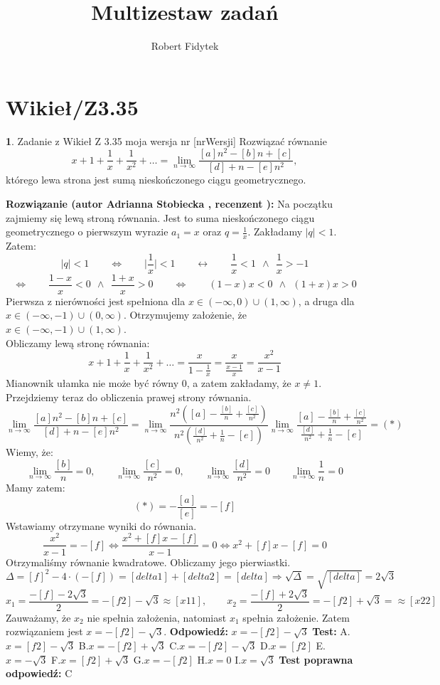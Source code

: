 \documentclass[12pt, a4paper]{article}
\title{Multizestaw zadań}
\author{Robert Fidytek}
\date{}
\theoremstyle{definition} %
\newtheorem{zad}{}
\newcommand{\kategoria}[1]{\section{#1}} %
\newcommand{\zadStart}[1]{\begin{zad}#1\newline} %
\newcommand{\zadStop}{\end{zad}}   %
\newcommand{\rozwStart}[2]{\noindent \textbf{Rozwiązanie (autor #1 , recenzent #2): }\newline} %
\newcommand{\rozwStop}{\newline}                                            %
\newcommand{\odpStart}{\noindent \textbf{Odpowiedź:}\newline}    %
\newcommand{\odpStop}{\newline}                                             %
\newcommand{\testStart}{\noindent \textbf{Test:}\newline} %
\newcommand{\testStop}{\newline} %
\newcommand{\kluczStart}{\noindent \textbf{Test poprawna odpowiedź:}\newline} %
\newcommand{\kluczStop}{\newline} %
\begin{document}
\maketitle


\kategoria{Wikieł/Z3.35}
\zadStart{Zadanie z Wikieł Z 3.35 moja wersja nr [nrWersji]}
Rozwiązać równanie 
$$x+1+\frac{1}{x}+\frac{1}{x^2}+\dots=\lim_{n\to\infty}\frac{[a]n^2-[b]n+[c]}{[d]+n-[e]n^2},$$ 
którego lewa strona jest sumą nieskończonego ciągu geometrycznego.
\zadStop
\rozwStart{Adrianna Stobiecka}{}
Na początku zajmiemy się lewą stroną równania. Jest to suma nieskończonego ciągu geometrycznego o pierwszym wyrazie $a_1=x$ oraz $q=\frac{1}{x}$. Zakładamy $|q|<1$. Zatem:
$$|q|<1\qquad\Leftrightarrow\qquad\bigg|\frac{1}{x}\bigg|<1\qquad\leftrightarrow\qquad\frac{1}{x}<1~~\land~~\frac{1}{x}>-1$$
$$\Leftrightarrow\qquad\frac{1-x}{x}<0~~\land~~\frac{1+x}{x}>0\qquad\Leftrightarrow\qquad(1-x)x<0~~\land~~(1+x)x>0$$
Pierwsza z nierówności jest spełniona dla $x\in(-\infty,0)\cup(1,\infty)$, a druga dla $x\in(-\infty,-1)\cup(0,\infty)$. Otrzymujemy założenie, że $x\in(-\infty,-1)\cup(1,\infty)$.
\\Obliczamy lewą stronę równania:
$$x+1+\frac{1}{x}+\frac{1}{x^2}+\dots=\frac{x}{1-\frac{1}{x}}=\frac{x}{\frac{x-1}{x}}=\frac{x^2}{x-1}$$
Mianownik ułamka nie może być równy $0$, a zatem zakładamy, że $x\ne1$.
\\Przejdziemy teraz do obliczenia prawej strony równania.
$$\lim_{n\to\infty}\frac{[a]n^2-[b]n+[c]}{[d]+n-[e]n^2}=\lim_{n\to\infty}\frac{n^2([a]-\frac{[b]}{n}+\frac{[c]}{n^2})}{n^2(\frac{[d]}{n^2}+\frac{1}{n}-[e])}\lim_{n\to\infty}\frac{[a]-\frac{[b]}{n}+\frac{[c]}{n^2}}{\frac{[d]}{n^2}+\frac{1}{n}-[e]}=(*)$$
Wiemy, że:
$$\lim_{n\to\infty}\frac{[b]}{n}=0,\qquad\lim_{n\to\infty}\frac{[c]}{n^2}=0,\qquad\lim_{n\to\infty}\frac{[d]}{n^2}=0\qquad\lim_{n\to\infty}\frac{1}{n}=0$$
Mamy zatem:
$$(*)=-\frac{[a]}{[e]}=-[f]$$
Wstawiamy otrzymane wyniki do równania.
$$\frac{x^2}{x-1}=-[f]\Leftrightarrow\frac{x^2+[f]x-[f]}{x-1}=0\Leftrightarrow x^2+[f]x-[f]=0$$
Otrzymaliśmy równanie kwadratowe. Obliczamy jego pierwiastki.
$$\Delta=[f]^2-4\cdot(-[f])=[delta1]+[delta2]=[delta]\Rightarrow\sqrt{\Delta}=\sqrt{[delta]}=2\sqrt{3}$$
$$x_1=\frac{-[f]-2\sqrt{3}}{2}=-[f2]-\sqrt{3}\approx[x11],\qquad x_2=\frac{-[f]+2\sqrt{3}}{2}=-[f2]+\sqrt{3}=\approx[x22]$$
Zauważamy, że $x_2$ nie spełnia założenia, natomiast $x_1$ spełnia założenie. Zatem rozwiązaniem jest $x=-[f2]-\sqrt{3}$.
\rozwStop
\odpStart
$x=-[f2]-\sqrt{3}$
\odpStop
\testStart
A.$x=[f2]-\sqrt{3}$
B.$x=-[f2]+\sqrt{3}$
C.$x=-[f2]-\sqrt{3}$
D.$x=[f2]$
E.$x=-\sqrt{3}$
F.$x=[f2]+\sqrt{3}$
G.$x=-[f2]$
H.$x=0$
I.$x=\sqrt{3}$
\testStop
\kluczStart
C
\kluczStop
\end{document}
